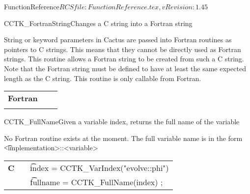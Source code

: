 \begin{cactuspart}{5}{FunctionReference}{$RCSfile: FunctionReference.tex,v $}{$Revision: 1.45 $}
\begin{CCTKFunc}{CCTK\_FortranString}{Changes a C string into a Fortran string}
\label{CCTK-FortranString}
\showargs
\begin{params}
\end{params}
\begin{discussion}
String or keyword parameters in Cactus are passed into Fortran routines as
pointers to C strings. This means that they cannot be directly used as Fortran
strings. This routine allows a Fortran string to be created from such a C string. Note that the Fortran string must be defined to have at least the same expected length as the C string. This routine is only callable from Fortran.
\end{discussion}
\begin{examples}
\begin{tabular}{@{}p{3cm}cp{11cm}}
\hfill {\bf Fortran} && \\
\\
\end{tabular}
\end{examples}
\begin{errorcodes}
\end{errorcodes}
\end{CCTKFunc}




\begin{CCTKFunc}{CCTK\_FullName}{Given a variable index, returns the full name of the variable}
\label{CCTK-FullName}
\showcargs
\begin{params}
\end{params}
\begin{discussion}
No Fortran routine exists at the moment. The full variable name is in
the form {\t <implementation>::<variable>}
\end{discussion}
\begin{examples}
\begin{tabular}{@{}p{3cm}cp{11cm}}
\hfill {\bf C} && {\t index = CCTK\_VarIndex("evolve::phi")}\\
               &&{\t fullname = CCTK\_FullName(index) ;}
\\
\end{tabular}
\end{examples}
\begin{errorcodes}
\end{errorcodes}
\end{CCTKFunc}





\end{cactuspart}

